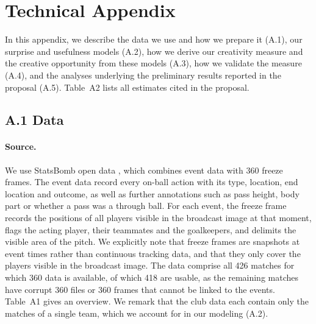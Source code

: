 \section*{Technical Appendix}

In this appendix, we describe the data we use and how we prepare it (A.1), our surprise and usefulness models
(A.2), how we derive our creativity measure and the creative opportunity from these models (A.3), how we validate
the measure (A.4), and the analyses underlying the preliminary results reported in the proposal (A.5). Table~A2
lists all estimates cited in the proposal.

\subsection*{A.1 Data}

\paragraph{Source.} We use StatsBomb open data \parencite{statsbomb2024open}, which combines event data with 360
freeze frames. The event data record every on-ball action with its type, location, end location and outcome, as well
as further annotations such as pass height, body part or whether a pass was a through ball. For each event, the
freeze frame records the positions of all players visible in the broadcast image at that moment, flags the acting
player, their teammates and the goalkeepers, and delimits the visible area of the pitch. We explicitly note that
freeze frames are snapshots at event times rather than continuous tracking data, and that they only cover the players
visible in the broadcast image. The data comprise all 426 matches for which 360 data is available, of which 418 are
usable, as the remaining matches have corrupt 360 files or 360 frames that cannot be linked to the events.
Table~A1 gives an overview. We remark that the club data each contain only the matches of a single team, which we
account for in our modeling (A.2).

